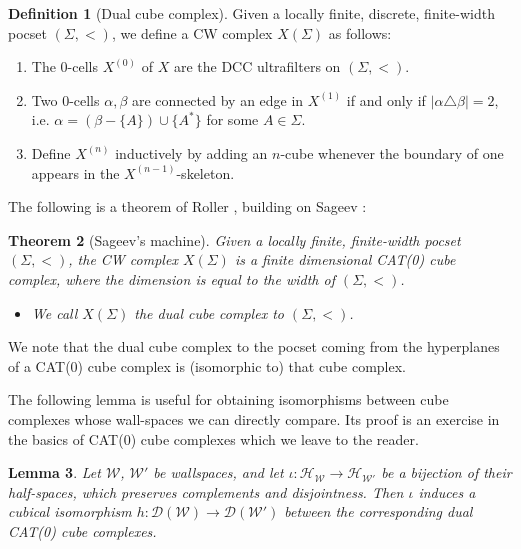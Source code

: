 \documentclass{amsart}
\newtheorem{theorem}{Theorem}[section]
\newtheorem{lemma}[theorem]{Lemma}
\theoremstyle{definition}
\newtheorem{definition}[theorem]{Definition}
\theoremstyle{remark}
\theoremstyle{definition}
\newcommand{\calD}{\mathcal{D}}
\newcommand{\calH}{\mathcal{H}}
\newcommand{\calW}{\mathcal{W}}
\begin{document}
\begin{definition}[Dual cube complex]\label{defn:dual CCC}
Given a locally finite, discrete, finite-width pocset $(\Sigma,<)$, we define a CW complex $X(\Sigma)$ as follows:
\begin{enumerate}
\item The $0$-cells $X^{(0)}$ of $X$ are the DCC ultrafilters on $(\Sigma, <)$.
\item Two $0$-cells $\alpha, \beta$ are connected by an edge in $X^{(1)}$ if and only if $|\alpha \triangle \beta| = 2$, i.e. $\alpha = (\beta - \{A\}) \cup \{A^*\}$ for some $A \in \Sigma$.
\item Define $X^{(n)}$ inductively by adding an $n$-cube whenever the boundary of one appears in the $X^{(n-1)}$-skeleton.
\end{enumerate}
\end{definition}


The following is a theorem of Roller \cite{Roller}, building on Sageev \cite{Sageev:cubulation}:

\begin{theorem}[Sageev's machine]\label{thm:Sageev}
Given a locally finite, finite-width pocset $(\Sigma,<)$, the CW complex $X(\Sigma)$ is a finite dimensional CAT(0) cube complex, where the dimension is equal to the width of $(\Sigma, <)$.
\begin{itemize}
\item We call $X(\Sigma)$ the \emph{dual cube complex} to $(\Sigma, <)$.
\end{itemize}
\end{theorem}

We note that the dual cube complex to the pocset coming from the hyperplanes of a CAT(0) cube complex is (isomorphic to) that cube complex.

The following lemma is useful for obtaining isomorphisms between cube complexes whose wall-spaces we can directly compare.  Its proof is an exercise in the basics of CAT(0) cube complexes which we leave to the reader.

\begin{lemma}\label{lem:halfspaces_bijection}
 Let $\calW$, $\calW'$ be wallspaces, and let $\iota:\calH_{\calW} \to \calH_{\calW'}$ be a bijection of their half-spaces, which preserves
 complements and disjointness.  Then $\iota$ induces a cubical isomorphism
$h:\calD(\calW)\to \calD(\calW')$
between the corresponding dual CAT(0) cube complexes.
\end{lemma}
\end{document}
